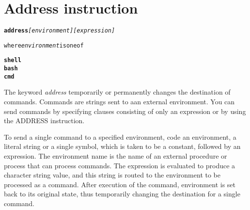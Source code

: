 \chapter{Address instruction}\label{refparse}
\begin{shaded}
\begin{alltt}
\textbf{address} \emph{[environment]} \emph{[expression]}

where \emph{environment} is one of

    \textbf{shell}
    \textbf{bash}
    \textbf{cmd}

\end{alltt}
\end{shaded}
The keyword \emph{address} temporarily or permanently changes the destination of commands. Commands are strings sent to aan external environment. You can send commands by specifying clauses consisting of only an expression or by using the ADDRESS instruction.

To send a single command to a specified environment, code an environment, a literal string or a single symbol, which is taken to be a constant, followed by an expression. The environment name is the name of an external procedure or process that can process commands. The expression is evaluated to produce a character string value, and this string is routed to the environment to be processed as a command. After execution of the command, environment is set back to its original state, thus temporarily changing the destination for a single command.